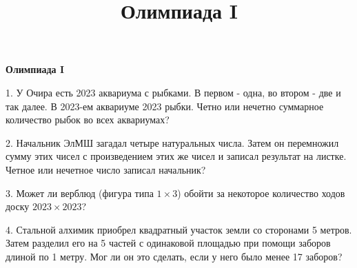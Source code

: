 \centerline{\bf \Huge Олимпиада I}
\title{Олимпиада I}

1. У Очира есть 2023 аквариума с рыбками. В первом - одна, во втором - две и так далее. В 2023-ем аквариуме 2023 рыбки. Четно или нечетно суммарное количество рыбок во всех аквариумах?

2. Начальник ЭлМШ загадал четыре натуральных числа. Затем он перемножил сумму этих чисел с произведением этих же чисел и записал результат на листке. Четное или нечетное число записал начальник?

3. Может ли верблюд (фигура типа $1\times3$) обойти за некоторое количество ходов доску $2023\times2023$?

4. Стальной алхимик приобрел квадратный участок земли со сторонами 5 метров. Затем разделил его на 5 частей с одинаковой площадью при помощи заборов длиной по 1 метру. Мог ли он это сделать, если у него было менее 17 заборов?